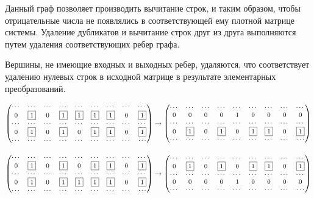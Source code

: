 Данный граф позволяет производить вычитание строк, и таким образом, чтобы отрицательные числа не появлялись в соответствующей ему плотной матрице системы. Удаление дубликатов и вычитание строк друг из друга выполняются путем удаления соответствующих ребер графа. 

Вершины, не имеющие входных и выходных ребер, удаляются, что соответствует удалению нулевых строк в исходной матрице в результате элементарных преобразований.

\[
{\small
\begin{pmatrix}
    \cdots & \cdots & \cdots & \cdots & \cdots & \cdots & \cdots & \cdots & \cdots \cr
    0 & \fbox{1} & 0 & \fbox{1} & \fbox{1} & \fbox{1} & \fbox{1} & 0 & \fbox{1} \cr
    \cdots & \cdots & \cdots & \cdots & \cdots & \cdots & \cdots & \cdots & \cdots \cr
    0 & \fbox{1} & 0 & \fbox{1} & 0 & \fbox{1} & \fbox{1} & 0 & \fbox{1} \cr
    \cdots & \cdots & \cdots & \cdots & \cdots & \cdots & \cdots & \cdots & \cdots
\end{pmatrix}
\rightarrow
\begin{pmatrix}
    \cdots & \cdots & \cdots & \cdots & \cdots & \cdots & \cdots & \cdots & \cdots \cr
    0 & 0 & 0 & 0 & 1 & 0 & 0 & 0 & 0 \cr
    \cdots & \cdots & \cdots & \cdots & \cdots & \cdots & \cdots & \cdots & \cdots \cr
    0 & \fbox{1} & 0 & \fbox{1} & 0 & \fbox{1} & \fbox{1} & 0 & \fbox{1} \cr
    \cdots & \cdots & \cdots & \cdots & \cdots & \cdots & \cdots & \cdots & \cdots
\end{pmatrix}
}
\]

\[
{\small
\begin{pmatrix}
    \cdots & \cdots & \cdots & \cdots & \cdots & \cdots & \cdots & \cdots & \cdots \cr
    0 & \fbox{1} & 0 & \fbox{1} & 0 & \fbox{1} & \fbox{1} & 0 & \fbox{1} \cr
    \cdots & \cdots & \cdots & \cdots & \cdots & \cdots & \cdots & \cdots & \cdots \cr
    0 & \fbox{1} & 0 & \fbox{1} & \fbox{1} & \fbox{1} & \fbox{1} & 0 & \fbox{1} \cr
    \cdots & \cdots & \cdots & \cdots & \cdots & \cdots & \cdots & \cdots & \cdots
\end{pmatrix}
\rightarrow
\begin{pmatrix}
    \cdots & \cdots & \cdots & \cdots & \cdots & \cdots & \cdots & \cdots & \cdots \cr
    0 & \fbox{1} & 0 & \fbox{1} & 0 & \fbox{1} & \fbox{1} & 0 & \fbox{1} \cr
    \cdots & \cdots & \cdots & \cdots & \cdots & \cdots & \cdots & \cdots & \cdots \cr
    0 & 0 & 0 & 0 & 1 & 0 & 0 & 0 & 0 \cr
    \cdots & \cdots & \cdots & \cdots & \cdots & \cdots & \cdots & \cdots & \cdots
\end{pmatrix}
}
\]

